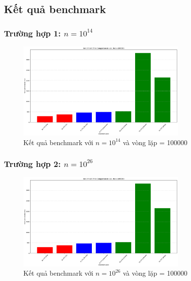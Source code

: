 \subsection{Kết quả benchmark}
\subsubsection{Trường hợp 1: \( n = 10^{14} \)}
\begin{figure}[h]
    \centering
    \includegraphics[width=0.75\textwidth]{images/n_14_100000.png}
    \caption{Kết quả benchmark với \( n = 10^{14} \) và vòng lặp = 100000}
    \label{fig:bench_n_14}
\end{figure}

\subsubsection{Trường hợp 2: \( n = 10^{26} \)}
\begin{figure}[h]
    \centering
    \includegraphics[width=0.75\textwidth]{images/n_14_100000.png} %
    \caption{Kết quả benchmark với \( n = 10^{26} \) và vòng lặp = 100000}
    \label{fig:bench_n_26}
\end{figure}

